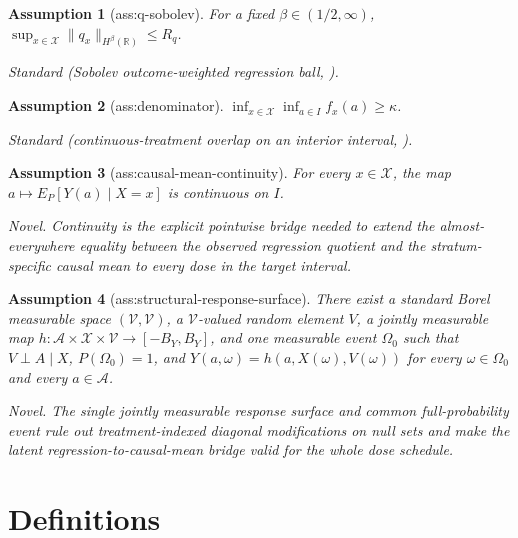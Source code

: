 \documentclass{article}
\newtheorem{assumption}{Assumption}
\begin{document}
\begin{assumption}[ass:q-sobolev]\label{ass:q-sobolev}
For a fixed \(\beta\in(1/2,\infty)\), \(\sup_{x\in\mathcal X}\|q_x\|_{H^{\beta}(\mathbb R)}\le R_q\).
\par\smallskip\noindent\emph{Standard} (Sobolev outcome-weighted regression ball, \cite{KatoSasaki2019}).
\end{assumption}

\begin{assumption}[ass:denominator]\label{ass:denominator}
\(\inf_{x\in\mathcal X}\inf_{a\in I}f_x(a)\ge\kappa\).
\par\smallskip\noindent\emph{Standard} (continuous-treatment overlap on an interior interval, \cite{HuangZhang2023}).
\end{assumption}

\begin{assumption}[ass:causal-mean-continuity]\label{ass:causal-mean-continuity}
For every \(x\in\mathcal X\), the map \(a\mapsto E_P[Y(a)\mid X=x]\) is continuous on \(I\).
\par\smallskip\noindent\emph{Novel.} Continuity is the explicit pointwise bridge needed to extend the almost-everywhere equality between the observed regression quotient and the stratum-specific causal mean to every dose in the target interval.
\end{assumption}

\begin{assumption}[ass:structural-response-surface]\label{ass:structural-response-surface}
There exist a standard Borel measurable space \((\mathcal V,\mathscr V)\), a \(\mathcal V\)-valued random element \(V\), a jointly measurable map \(h:\mathcal A\times\mathcal X\times\mathcal V\to[-B_Y,B_Y]\), and one measurable event \(\Omega_0\) such that \(V\perp A\mid X\), \(P(\Omega_0)=1\), and \(Y(a,\omega)=h(a,X(\omega),V(\omega))\) for every \(\omega\in\Omega_0\) and every \(a\in\mathcal A\).
\par\smallskip\noindent\emph{Novel.} The single jointly measurable response surface and common full-probability event rule out treatment-indexed diagonal modifications on null sets and make the latent regression-to-causal-mean bridge valid for the whole dose schedule.
\end{assumption}

\section{Definitions}
\end{document}
